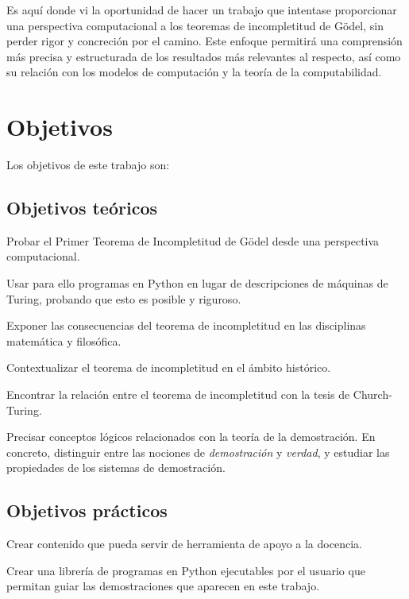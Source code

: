 Es aquí donde vi la oportunidad de hacer un trabajo que intentase proporcionar una perspectiva computacional a los teoremas de incompletitud de Gödel, sin perder rigor y concreción por el camino. Este enfoque permitirá una comprensión más precisa y estructurada de los resultados más relevantes al respecto, así como su relación con los modelos de computación y la teoría de la computabilidad.

\pagebreak

\section*{Objetivos}

Los objetivos de este trabajo son:

\subsection*{Objetivos teóricos}

\begin{enumerate}[label={[}T\arabic*{]}]
    \item Probar el Primer Teorema de Incompletitud de Gödel desde una perspectiva computacional.
    \item Usar para ello programas en Python en lugar de descripciones de máquinas de Turing, probando que esto es posible y riguroso.
    \item Exponer las consecuencias del teorema de incompletitud en las disciplinas matemática y filosófica.
    \item Contextualizar el teorema de incompletitud en el ámbito histórico.
    \item Encontrar la relación entre el teorema de incompletitud con la tesis de Church-Turing.
    \item Precisar conceptos lógicos relacionados con la teoría de la demostración. En concreto, distinguir entre las nociones de \emph{demostración} y \emph{verdad}, y estudiar las propiedades de los sistemas de demostración.
\end{enumerate}

\subsection*{Objetivos prácticos}

\begin{enumerate}[label={[}P\arabic*{]}]
    \item Crear contenido que pueda servir de herramienta de apoyo a la docencia.
    \item Crear una librería de programas en Python ejecutables por el usuario que permitan guiar las demostraciones que aparecen en este trabajo.
\end{enumerate}

\endinput

